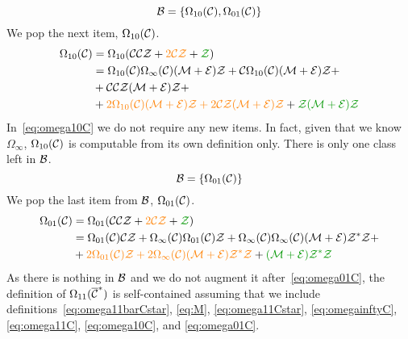 \documentclass[12pt, a4paper, twoside]{report}
\begin{document}
$$\mathcal{B} = \{\Omega_{10}(\mathcal{C}), \Omega_{01}(\mathcal{C})\}$$
We pop the next item, $\Omega_{10}(\mathcal{C})$.
\begin{align}
  \begin{aligned}
    \Omega_{10}(\C) &= \Omega_{10}(\C\C\Z + \textcolor{orange}{2\C\Z} + \textcolor{green}{\Z})\\
    &= \Omega_{10}(\C)\Omega_\infty(\C)(\M+\EE)\Z + \C\Omega_{10}(\C)(\M+\EE)\Z +\\
    &+ \C\C\Z(\M+\EE)\Z +\\
    &+ \textcolor{orange}{2\Omega_{10}(\C)(\M+\EE)\Z + 2\C\Z(\M+\EE)\Z} + \textcolor{green}{\Z(\M+\EE)\Z}
  \end{aligned}
  \label{eq:omega10C}
\end{align}
In~\eqref{eq:omega10C} we do not require any new items. In fact, given that we know $\Omega_\infty$, $\Omega_{10}(\mathcal{C})$ is computable from its own definition only. There is only one class left in $\mathcal{B}$.
$$\mathcal{B} = \{\Omega_{01}(\mathcal{C})\}$$
We pop the last item from $\mathcal{B}$, $\Omega_{01}(\mathcal{C})$.
\begin{align}
  \begin{aligned}
    \Omega_{01}(\C) &= \Omega_{01}(\C\C\Z + \textcolor{orange}{2\C\Z} + \textcolor{green}{\Z})\\
    &= \Omega_{01}(\C)\C\Z + \Omega_\infty(\C)\Omega_{01}(\C)\Z + \Omega_\infty(\C)\Omega_\infty(\C)(\M+\EE)\Z^*\Z +\\
    &+ \textcolor{orange}{2\Omega_{01}(\C)\Z + 2\Omega_\infty(\C)(\M+\EE)\Z^*\Z} + \textcolor{green}{(\M+\EE)\Z^*\Z}
  \end{aligned}
  \label{eq:omega01C}
\end{align}
As there is nothing in $\mathcal{B}$ and we do not augment it after~\eqref{eq:omega01C}, the definition of $\Omega_{11}(\overline{\mathcal{C}}^*)$ is self-contained assuming that we include definitions~\eqref{eq:omega11barCstar}, \eqref{eq:M}, \eqref{eq:omega11Cstar}, \eqref{eq:omegainftyC}, \eqref{eq:omega11C}, \eqref{eq:omega10C}, and \eqref{eq:omega01C}.\\
\end{document}
